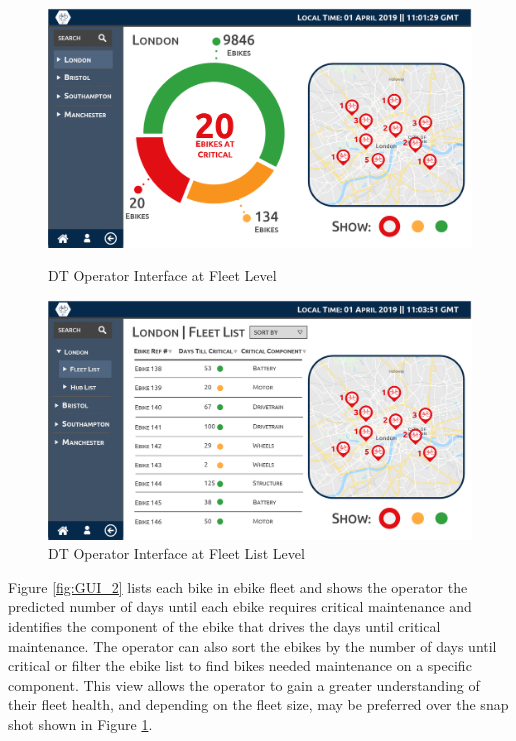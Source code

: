 \documentclass[a4paper, 10pt]{article}
\numberwithin{equation}{section}
\begin{document}
\begin{figure}[h!]
\centering
\begin{minipage}{.5\textwidth}
  \centering
        \includegraphics[width=\textwidth]{images/screen1.png}
\caption{DT Operator Interface at Fleet Level}
\label{fig:GUI_1}
\end{minipage}%
\begin{minipage}{.5\textwidth}
  \centering
    \includegraphics[width=\textwidth]{images/screen2.png}
\caption{DT Operator Interface at Fleet List Level}
\label{fig:GUI_1}
\end{minipage}
\end{figure}


Figure \ref{fig:GUI_2} lists each bike in ebike fleet and shows the operator the predicted number of days until each ebike requires critical maintenance and identifies the component of the ebike that drives the days until critical maintenance. The operator can also sort the ebikes by the number of days until critical or filter the ebike list to find bikes needed maintenance on a specific component. This view allows the operator to gain a greater understanding of their fleet health, and depending on the fleet size, may be preferred over the snap shot shown in Figure \ref{fig:GUI_1}. \medbreak
\end{document}
